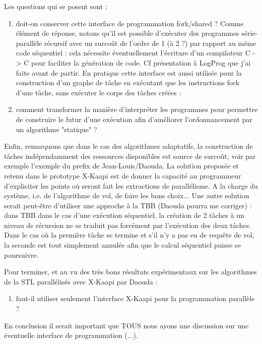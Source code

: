\documentclass[12pt]{report}
\begin{document}
Les questions qui se posent sont :
\begin{enumerate}[label=\textbf{Q \theenumi.},ref=\textbf{Q \theenumi},start=1]
	\item doit-on conserver cette interface de programmation fork/shared ? 
Comme élément de réponse, notons qu'il est possible d'exécuter des programmes série-parallèle récursif avec un surcoût de l'ordre de 1 (à 2 ?)  par rapport au même code séquentiel : cela nécessite éventuellement l'écriture d'un compilateur C -> C pour faciliter la génération de code. Cf présentation à LogProg que j'ai faite avant de partir.
En pratique cette interface est aussi utilisée pour la construction d'un graphe de tâche en exécutant que les instructions fork d'une tâche, sans exécuter le corps des tâches créées : 
	\item comment transformer la manière d'interpréter les programmes pour permettre de construire le futur d'une exécution afin d'améliorer l'ordonnancement par un algorithme "statique" ?
\end{enumerate}

	Enfin, remarquons que dans le cas des algorithmes adaptatifs, la construction de tâches indépendamment des ressources disponibles est source de surcoût, voir par exemple l'exemple du prefix de Jean-Louis/Daouda. La solution proposée et retenu dans le prototype X-Kaapi est de donner la capacité au programmeur d'expliciter les points où seront fait les extractions de parallélisme. A la charge du système, i.e. de l'algorithme de vol, de faire les bons choix...
	Une autre solution serait peut-être d'utiliser une approche à la TBB (Daouda pourra me corriger) : dans TBB dans le cas d'une exécution séquentiel, la création de 2 tâches à un niveau de récursion ne se traduit pas forcément par l'exécution des deux tâches. Dans le cas où la première tâche se termine et s'il n'y a pas eu de requête de vol, la seconde est tout simplement annulée afin que le calcul séquentiel puisse se poursuivre.

Pour terminer, et au vu des très bons résultats expérimentaux sur les algorithmes de la STL parallélisés avec X-Kaapi par Daouda :
\begin{enumerate}[label=\textbf{Q \theenumi.},ref=\textbf{Q \theenumi},resume]
	\item  faut-il utiliser seulement l'interface X-Kaapi pour la programmation parallèle ?
\end{enumerate}

En conclusion il serait important que TOUS nous ayons une discussion sur une éventuelle interface de programmation (...). 
\end{document}
